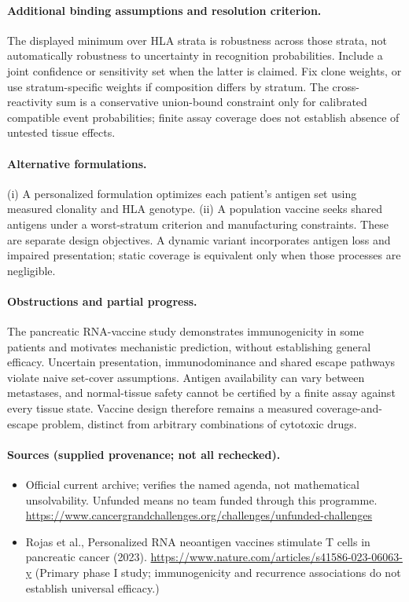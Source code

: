 \documentclass[11pt]{article}
\begin{document}
\paragraph{Additional binding assumptions and resolution criterion.} The displayed minimum over HLA strata is robustness across those strata, not automatically robustness to uncertainty in recognition probabilities. Include a joint confidence or sensitivity set when the latter is claimed. Fix clone weights, or use stratum-specific weights if composition differs by stratum. The cross-reactivity sum is a conservative union-bound constraint only for calibrated compatible event probabilities; finite assay coverage does not establish absence of untested tissue effects.

\paragraph{Alternative formulations.} (i) A personalized formulation optimizes each patient's antigen set using measured clonality and HLA genotype. (ii) A population vaccine seeks shared antigens under a worst-stratum criterion and manufacturing constraints. These are separate design objectives. A dynamic variant incorporates antigen loss and impaired presentation; static coverage is equivalent only when those processes are negligible.

\paragraph{Obstructions and partial progress.} The pancreatic RNA-vaccine study demonstrates immunogenicity in some patients and motivates mechanistic prediction, without establishing general efficacy. Uncertain presentation, immunodominance and shared escape pathways violate naive set-cover assumptions. Antigen availability can vary between metastases, and normal-tissue safety cannot be certified by a finite assay against every tissue state. Vaccine design therefore remains a measured coverage-and-escape problem, distinct from arbitrary combinations of cytotoxic drugs.

\paragraph{Sources (supplied provenance; not all rechecked).} \begin{itemize}
\item Official current archive; verifies the named agenda, not mathematical unsolvability. Unfunded means no team funded through this programme. \url{https://www.cancergrandchallenges.org/challenges/unfunded-challenges}
\item Rojas et al., Personalized RNA neoantigen vaccines stimulate T cells in pancreatic cancer (2023). \url{https://www.nature.com/articles/s41586-023-06063-y} (Primary phase I study; immunogenicity and recurrence associations do not establish universal efficacy.)
\end{itemize}
\end{document}
